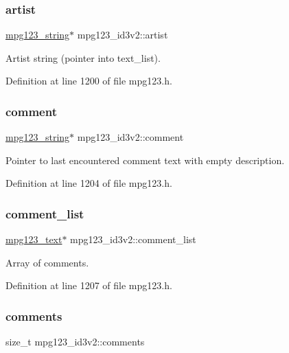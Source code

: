 \subsubsection{\texorpdfstring{artist}{artist}}
{\footnotesize\ttfamily \mbox{\hyperlink{structmpg123__string}{mpg123\+\_\+string}}$\ast$ mpg123\+\_\+id3v2\+::artist}

Artist string (pointer into text\+\_\+list). 

Definition at line 1200 of file mpg123.\+h.

\mbox{\label{structmpg123__id3v2_a33f276ee0202d9bb8609b90a2dc84e41}} 
\subsubsection{\texorpdfstring{comment}{comment}}
{\footnotesize\ttfamily \mbox{\hyperlink{structmpg123__string}{mpg123\+\_\+string}}$\ast$ mpg123\+\_\+id3v2\+::comment}

Pointer to last encountered comment text with empty description. 

Definition at line 1204 of file mpg123.\+h.

\mbox{\label{structmpg123__id3v2_ab848dd213b0c7c352ccf4db299eb47fb}} 
\subsubsection{\texorpdfstring{comment\_list}{comment\_list}}
{\footnotesize\ttfamily \mbox{\hyperlink{structmpg123__text}{mpg123\+\_\+text}}$\ast$ mpg123\+\_\+id3v2\+::comment\+\_\+list}

Array of comments. 

Definition at line 1207 of file mpg123.\+h.

\mbox{\label{structmpg123__id3v2_aa6b0ae610df4b4f5ed7f848ed88c86c9}} 
\subsubsection{\texorpdfstring{comments}{comments}}
{\footnotesize\ttfamily size\+\_\+t mpg123\+\_\+id3v2\+::comments}

